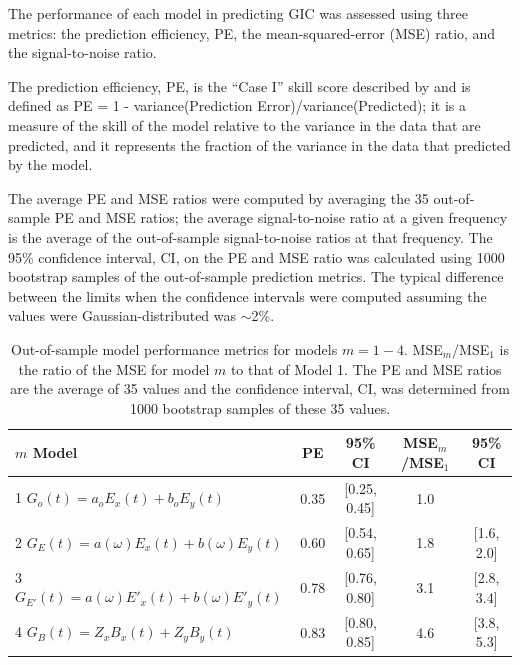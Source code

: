 \documentclass[draft,linenumbers]{agujournal2018}
\begin{document}
The performance of each model in predicting GIC was assessed using three metrics: the prediction efficiency, PE, the mean-squared-error (MSE) ratio, and the signal-to-noise ratio.

The prediction efficiency, PE, is the ``Case I'' skill score described by \cite{Murphy1988} and is defined as PE = 1 - variance(Prediction Error)/variance(Predicted); it is a measure of the skill of the model relative to the variance in the data that are predicted, and it represents the fraction of the variance in the data that predicted by the model.

The average PE and MSE ratios were computed by averaging the 35 out-of-sample PE and MSE ratios; the average signal-to-noise ratio at a given frequency is the average of the out-of-sample signal-to-noise ratios at that frequency. The 95\% confidence interval, CI, on the PE and MSE ratio was calculated using 1000 bootstrap samples of the out-of-sample prediction metrics. The typical difference between the limits when the confidence intervals were computed assuming the values were Gaussian-distributed was $\sim$2\%.

\begin{table}
\caption{Out-of-sample model performance metrics for models $m=1-4$. MSE$_m$/MSE$_1$ is the ratio of the MSE for model $m$ to that of Model 1. The PE and MSE ratios are the average of 35 values and the confidence interval, CI, was determined from 1000 bootstrap samples of these 35 values.}
\centering
\begin{tabular}{l c c c c}
\hline
$m$\hspace{1em} Model & PE & 95\% CI & MSE$_m$/MSE$_1$ & 95\% CI\\
\hline
1\hspace{1em} $G_o(t) = a_oE_x(t) + b_oE_y(t)$ & 0.35 & [0.25, 0.45] & 1.0 & \\
2\hspace{1em} $G_E(t) = a(\omega)E_x(t) + b(\omega)E_y(t)$ & 0.60 & [0.54, 0.65] & 1.8 & [1.6, 2.0]\\
3\hspace{1em} $G_{E'}(t) = a(\omega)E'_x(t) + b(\omega)E'_y(t)$ & 0.78 & [0.76, 0.80] & 3.1 & [2.8, 3.4]\\
4\hspace{1em} $G_{B}(t) = Z_xB_x(t) + Z_yB_y(t)$ & 0.83 & [0.80, 0.85] & 4.6 & [3.8, 5.3]\\
\hline
\end{tabular}
\end{table}
\end{document}

